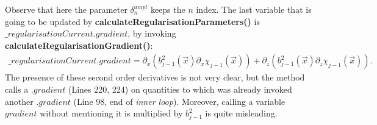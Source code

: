 \documentclass[10pt,a4paper]{article}
\begin{document}
{
Observe that here the parameter $\delta^{ampl}_n$ keeps the $n$ index.
}
{The last variable that is going to be updated by \textbf{calculateRegularisationParameters()} is $\_regularisationCurrent.gradient$, by invoking \textbf{calculateRegularisationGradient()}:
\begin{align} 
\label{eq:calculateRegularisationGradient}
\_regularisationCurrent.gradient = \partial_x (b^2_{j-1} (\vec{x}) \partial_x \chi_{j-1} (\vec{x}) ) + \partial_z (b^2_{j-1} (\vec{x}) \partial_z \chi_{j-1} (\vec{x}) ).
\end{align}
The presence of these second order derivatives is not very clear, but the method calls a $.gradient$ (Lines 220, 224) on quantities to which was already invoked another $.gradient$ (Line 98, end of \textit{inner loop}). 
Moreover, calling a variable $gradient$ without mentioning it is multiplied by $b_{j-1}^2$ is quite misleading.
}
\newline
\end{document}
